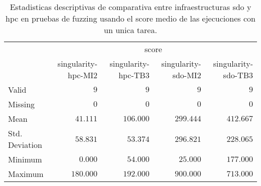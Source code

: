 
\begin{table}[h]
	\centering
    \caption{Estadisticas descriptivas de comparativa entre infraestructuras sdo y hpc en pruebas de fuzzing usando el score medio de las ejecuciones con un unica tarea.}
    \label{tab:stats_score_by_infra-test-unique}
	{
		\begin{tabular}{lrrrr}
			\toprule
			\multicolumn{1}{c}{} & \multicolumn{4}{c}{score} \\
			\cline{2-5}
			 & singularity-hpc-MI2 & singularity-hpc-TB3 & singularity-sdo-MI2 & singularity-sdo-TB3  \\
			\cmidrule[0.4pt]{1-5}
			Valid & $9$ & $9$ & $9$ & $9$  \\
			Missing & $0$ & $0$ & $0$ & $0$  \\
			Mean & $41.111$ & $106.000$ & $299.444$ & $412.667$  \\
			Std. Deviation & $58.831$ & $53.374$ & $296.821$ & $228.065$  \\
			Minimum & $0.000$ & $54.000$ & $25.000$ & $177.000$  \\
			Maximum & $180.000$ & $192.000$ & $900.000$ & $713.000$  \\
			\bottomrule
		\end{tabular}
	}
\end{table}
